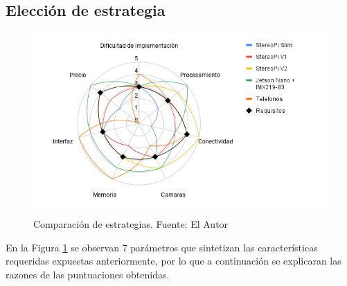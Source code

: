 \subsection{Elección de estrategia}
\begin{figure}[H]
    \centering
    \includegraphics[scale=0.5]{Recursos/spyder_chart.png}
    \caption[Comparación de estrategias.]{Comparación de estrategias. {\footnotesize Fuente: El Autor}}
    \label{spyder_chart}
\end{figure}
En la Figura \ref{spyder_chart} se observan 7 parámetros que sintetizan las características requeridas expuestas anteriormente, por lo que a continuación se explicaran las razones de las puntuaciones obtenidas.
